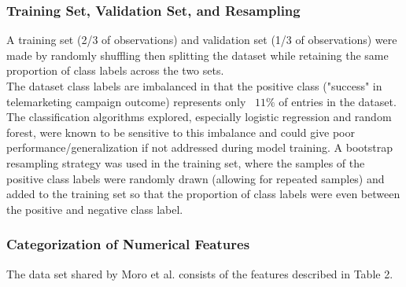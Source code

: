 \documentclass[11pt]{article}
\begin{document}
\subsubsection{Training Set, Validation Set, and Resampling}
 A training set (2/3 of observations) and validation set (1/3 of observations) were made by randomly shuffling then splitting the dataset while retaining the same proportion of class labels across the two sets.\\


The dataset class labels are imbalanced in that the positive class ("success" in telemarketing campaign outcome) represents only ~$11\%$ of entries in the dataset. The classification algorithms explored, especially logistic regression and random forest, were known to be sensitive to this imbalance and could give poor performance/generalization if not addressed during model training. A bootstrap resampling strategy was used in the training set, where the samples of the positive class labels were randomly drawn (allowing for repeated samples) and added to the training set so that the proportion of class labels were even between the positive and negative class label.

\subsubsection{Categorization of Numerical Features }
 
The data set shared by Moro et al. consists of the features described in Table 2. 
\end{document}

